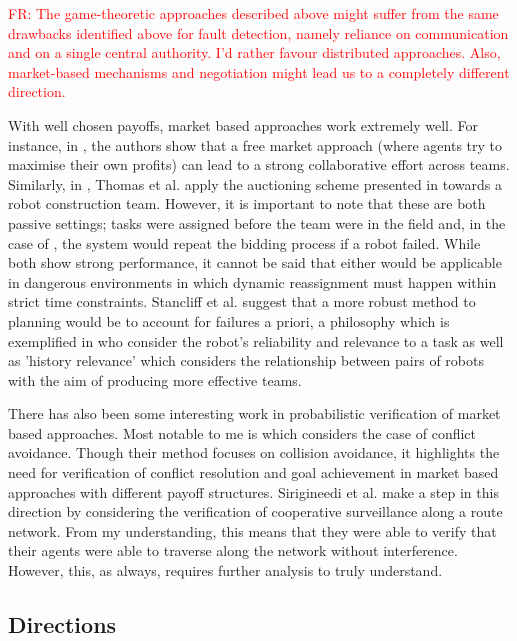 \documentclass[preprint,11pt]{report}
\newcommand\fr[1]{\textcolor{red}{FR: #1}}
\begin{document}
\fr{The game-theoretic approaches described above might suffer from the
  same drawbacks identified above for fault detection, namely reliance
  on communication and on a single central authority. I'd rather
  favour distributed approaches. Also, market-based mechanisms and
  negotiation might lead us to a completely different direction.}


With well chosen payoffs, market based approaches work extremely
well. For instance, in \cite{Dias2000ASystem}, the authors show that a
free market approach (where agents try to maximise their own profits)
can lead to a strong collaborative effort across teams. Similarly, in
\cite{Thomas2005Multi-robotScenarios}, Thomas et al. apply the
auctioning scheme presented in \cite{Gerkey2002Sold:Coordination}
towards a robot construction team. However, it is important to note
that these are both passive settings; tasks were assigned before the
team were in the field and, in the case of
\cite{Gerkey2002Sold:Coordination}, the system would repeat the
bidding process if a robot failed. While both show strong performance,
it cannot be said that either would be applicable in dangerous
environments in which dynamic reassignment must happen within strict
time constraints. Stancliff et
al. \cite{Stancliff2009PlanningAllocation} suggest that a more robust
method to planning would be to account for failures a priori, a
philosophy which is exemplified in \cite{Chen2010ACollaboration} who
consider the robot's reliability and relevance to a task as well as
'history relevance' which considers the relationship between pairs of
robots with the aim of producing more effective teams.

There has also been some interesting work in probabilistic
verification of market based approaches.  Most notable to me is
\cite{Pallottino2007ProbabilisticAvoidance} which considers the case
of conflict avoidance. Though their method focuses on collision
avoidance, it highlights the need for verification of conflict
resolution and goal achievement in market based approaches with
different payoff structures. Sirigineedi et
al. \cite{Sirigineedi2010DecentralisedApproach} make a step in this
direction by considering the verification of cooperative surveillance
along a route network.  From my understanding, this means that they
were able to verify that their agents were able to traverse along the
network without interference. However, this, as always, requires
further analysis to truly understand.

\subsection{Directions}
\end{document}
